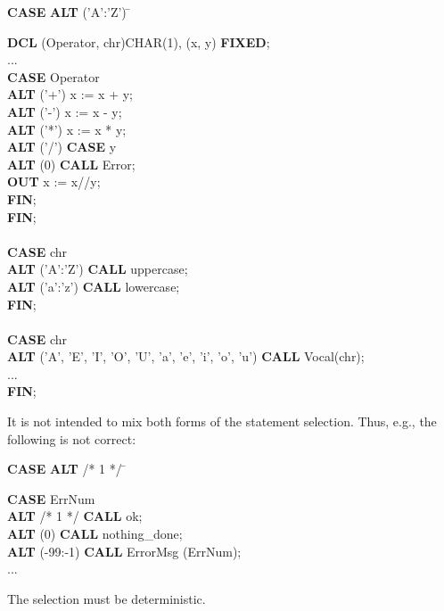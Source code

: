 \begin{tabbing}
{\bf CASE} \= {\bf ALT} ('A':'Z') \= \kill

{\bf DCL}  \> (Operator, chr)CHAR(1), (x, y) {\bf FIXED}; \> \\
...        \> \> \\
{\bf CASE} \> Operator \> \\
    \> {\bf ALT} ('+')    \> x := x + y; \\
    \> {\bf ALT} ('-')    \> x := x - y; \\
    \> {\bf ALT} ('*')    \> x := x * y; \\
    \> {\bf ALT} ('/')    \> {\bf CASE} y \\
    \>                    \> {\bf ALT} (0) {\bf CALL} Error;\\
    \>                    \> {\bf OUT} x := x//y;\\
    \>                    \> {\bf FIN};\\
{\bf FIN}; \> \> \\
    \> \> \\
{\bf CASE} \> chr \> \\
    \> {\bf ALT} ('A':'Z') \> {\bf CALL} uppercase;\\
    \> {\bf ALT} ('a':'z') \> {\bf CALL} lowercase;\\
{\bf FIN}; \> \> \\
    \> \> \\
{\bf CASE} \> chr \> \\
    \> {\bf ALT} ('A', 'E', 'I', 'O', 'U', 'a', 'e', 'i', 'o', 'u') {\bf CALL} Vocal(chr); \> \\
    \> ... \> \\
{\bf FIN}; \> \>
\end{tabbing}

It is not intended to mix both forms of the statement selection. Thus,
e.g., the following is not correct:

\begin{tabbing}
{\bf CASE} \= {\bf ALT} /* 1 */ \= \kill

{\bf CASE} \> ErrNum \> \\
    \> {\bf ALT} /* 1 */  \> {\bf CALL} ok;\\
    \> {\bf ALT} (0)      \> {\bf CALL} nothing\_done;\\
    \> {\bf ALT} (-99:-1) \> {\bf CALL} ErrorMsg (ErrNum);\\
    \> ... \>
\end{tabbing}

The selection must be deterministic.

